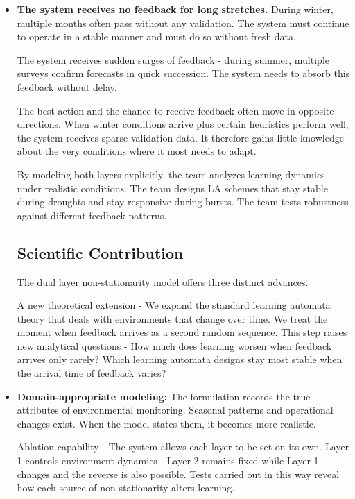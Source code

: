 \documentclass[11pt,a4paper]{article}
\begin{document}
\begin{itemize}
\item \textbf{The system receives no feedback for long stretches.} During winter, multiple months often pass without any validation. The system must continue to operate in a stable manner and must do so without fresh data.

The system receives sudden surges of feedback - during summer, multiple surveys confirm forecasts in quick succession. The system needs to absorb this feedback without delay.

The best action and the chance to receive feedback often move in opposite directions. When winter conditions arrive plus certain heuristics perform well, the system receives sparse validation data. It therefore gains little knowledge about the very conditions where it most needs to adapt.

By modeling both layers explicitly, the team analyzes learning dynamics under realistic conditions. The team designs LA schemes that stay stable during droughts and stay responsive during bursts. The team tests robustness against different feedback patterns.

\subsection{Scientific Contribution}

The dual layer non-stationarity model offers three distinct advances.

A new theoretical extension - We expand the standard learning automata theory that deals with environments that change over time. We treat the moment when feedback arrives as a second random sequence. This step raises new analytical questions - How much does learning worsen when feedback arrives only rarely? Which learning automata designs stay most stable when the arrival time of feedback varies?

\item \textbf{Domain-appropriate modeling:} The formulation records the true attributes of environmental monitoring. Seasonal patterns and operational changes exist. When the model states them, it becomes more realistic.

Ablation capability - The system allows each layer to be set on its own. Layer 1 controls environment dynamics - Layer 2 remains fixed while Layer 1 changes and the reverse is also possible. Tests carried out in this way reveal how each source of non stationarity alters learning.



\end{itemize}
\end{document}
